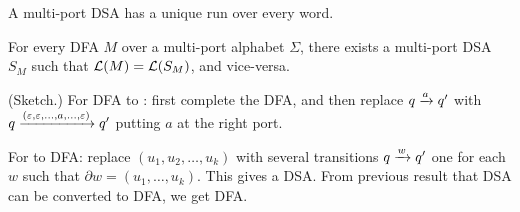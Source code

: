 \begin{lemma}
 A multi-port DSA has a unique run over every word.
\end{lemma}%

\begin{theorem}
 For every DFA $M$ over a multi-port alphabet $\Sigma$, there exists
 a multi-port DSA $S_M$ such that $\mathcal{L}(M) = \mathcal{L}(S_M)$, and
 vice-versa.
\end{theorem}
\begin{IEEEproof} (Sketch.) For DFA to \mdsa: first complete the DFA, and
 then replace $q \xrightarrow{a} q'$ with
 $q \xrightarrow{(\varepsilon, \varepsilon, \dots, a, \dots, \varepsilon)} q'$ putting $a$ at the right
 port.%

 For \mdsa to DFA: replace $(u_1, u_2, \dots, u_k)$ with several
 transitions $q \xrightarrow{w} q'$ one for each $w$ such that
 $\partial w = (u_1, \dots, u_k)$. This gives a DSA. From previous
 result that DSA can be converted to DFA, we get DFA.%

\end{IEEEproof}%






